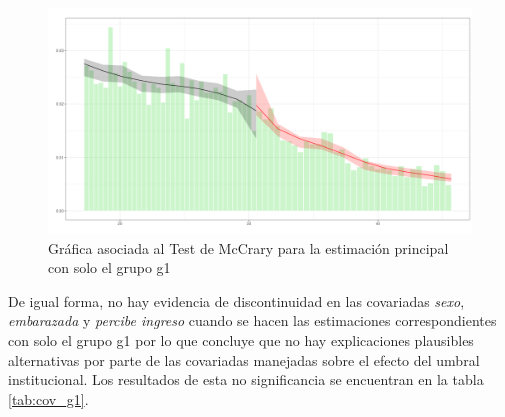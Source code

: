 \documentclass[AER]{AEA}
\begin{document}
\begin{figure}[h!]
    \centering
    \includegraphics[scale = 0.35]{imagenes/estimaxs_adicionales/mccrary_g1.png}
    \caption{Gráfica asociada al Test de McCrary para la estimación principal con solo el grupo g1}
    \label{fig:mccrary_g1}
\end{figure}

De igual forma, no hay evidencia de discontinuidad en las covariadas \textit{sexo}, \textit{embarazada} y \textit{percibe ingreso} cuando se hacen las estimaciones correspondientes con solo el grupo g1 por lo que concluye que no hay explicaciones plausibles alternativas por parte de las covariadas manejadas sobre el efecto del umbral institucional. Los resultados de esta no significancia se encuentran en la tabla \ref{tab:cov_g1}. 
\end{document}
